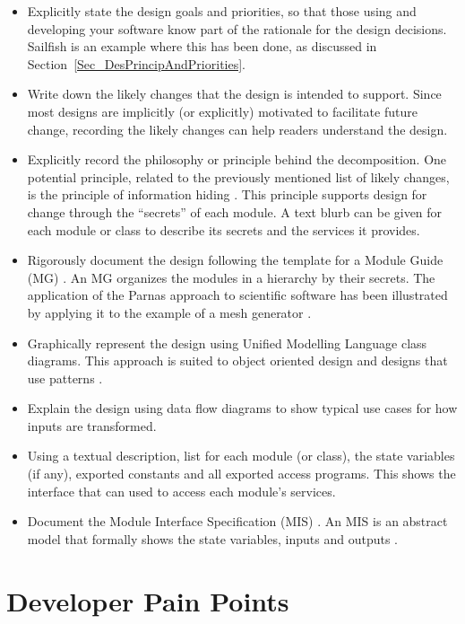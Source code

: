 \documentclass[final, 3p, times, authoryear]{elsarticle}
\begin{document}
\begin{itemize}
	\item Explicitly state the design goals and priorities, so that those using
	and developing your software know part of the rationale for the design
	decisions. Sailfish is an example where this has been done, as discussed in
	Section~\ref{Sec_DesPrincipAndPriorities}.
	\item Write down the likely changes that the design is intended to support.
	Since most designs are implicitly (or explicitly) motivated to facilitate
	future change, recording the likely changes can help readers understand the
	design.
	\item Explicitly record the philosophy or principle behind the
	decomposition. One potential principle, related to the previously mentioned
	list of likely changes, is the principle of information hiding
	\citep{Parnas1972a}.  This principle supports design for change through the
	``secrets'' of each module. A text blurb can be given for each module or
	class to describe its secrets and the services it provides.
	\item Rigorously document the design following the template for a Module
	Guide (MG) \citep{ParnasEtAl1984}.  An MG organizes the modules in a
	hierarchy by their secrets. The application of the Parnas approach to
	scientific software has been illustrated by applying it to the example of a
	mesh generator \citep{SmithAndYu2009}.
	\item Graphically represent the design using Unified Modelling Language
	class diagrams.  This approach is suited to object oriented design and
	designs that use patterns \citep{Gamma1995}.
	\item Explain the design using data flow diagrams to show typical use cases
	for how inputs are transformed.
	\item Using a textual description, list for each module (or class), the
	state variables (if any), exported constants and all exported access
	programs.  This shows the interface that can used to access each module's
	services.
	\item Document the Module Interface Specification (MIS)
	\citep{HoffmanAndStrooper1995}. An MIS is an abstract model that 
	formally shows the state variables, inputs and outputs
	\citep{ElSheikhEtAl2004, SmithAndYu2009}.
\end{itemize}

\section{Developer Pain Points} \label{painpoints}
\end{document}
